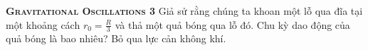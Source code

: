 \begin{problem}
\textbf{\textsc{Gravitational Oscillations 3}} Giả sử rằng chúng ta khoan một lỗ qua đĩa tại một khoảng cách \(r_0= \frac{R}{3}\) và thả một quả bóng qua lỗ đó. Chu kỳ dao động của quả bóng là bao nhiêu? Bỏ qua lực cản không khí.

\end{problem}
